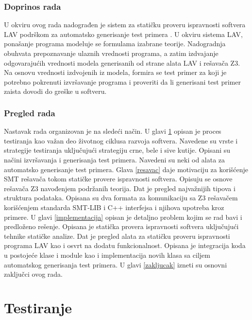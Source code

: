 \documentclass[12pt,oneside]{memoir}
\begin{document}
\subsection{Doprinos rada}

U okviru ovog rada nadograđen je sistem za statičku proveru ispravnosti softvera LAV podrškom za automatsko generisanje test primera \cite{LAVTool}. U okviru sistema
LAV, ponašanje programa modeluje se formulama izabrane teorije. Nadogradnja obuhvata prepoznavanje ulaznih vrednosti programa, a zatim izdvajanje odgovarajućih vrednosti modela generisanih od strane alata LAV i rešavača Z3. Na osnovu vrednosti izdvojenih iz modela, formira se test primer za koji je potrebno pokrenuti izvršavanje programa i proveriti da li generisani test primer zaista dovodi do greške u softveru.

\subsection{Pregled rada}
Nastavak rada organizovan je na sledeći način. U glavi \ref{testiranje} opisan je proces testiranja kao važan deo životnog ciklusa razvoja softvera. Navedene su vrste i strategije testiranja uključujući strategiju crne, bele i sive kutije. Opisani su načini izvršavanja i generisanja test primera. Navedeni su neki od alata za automatsko generisanje test primera. Glava \ref{resavac} daje motivaciju za korišćenje SMT rešavača tokom statičke provere ispravnosti softvera. Opisuju se osnove rešavača Z3 navođenjem podržanih teorija. Dat je pregled najvažnijih tipova i struktura podataka. Opisana su dva formata za komunikaciju sa Z3 rešavačem korišćenjem standarda SMT-LIB i C++ interfejsa i njihova upotreba kroz primere. U glavi \ref{implementacija} opisan je detaljno problem kojim se rad bavi i predloženo rešenje. Opisana je statička provera ispravnosti softvera uključujući tehnike statičke analize. Dat je pregled alata za statičku proveru ispravnosti programa LAV kao i osvrt na dodatu funkcionalnost. Opisana je integracija koda u postojeće klase i module kao i implementacija novih klasa sa ciljem automatskog generisanja test primera. U glavi \ref{zakljucak} izneti su osnovni zaključci ovog rada.



\chapter{Testiranje} \label{testiranje}
\end{document}
